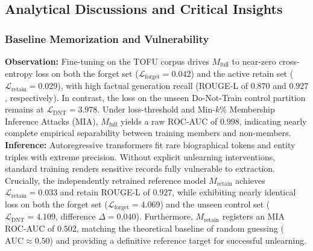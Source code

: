 \documentclass[11pt,a4paper]{article}
\begin{document}
\subsection{Analytical Discussions and Critical Insights}

\subsubsection{Baseline Memorization and Vulnerability}
\textbf{Observation:} Fine-tuning on the TOFU corpus drives $M_{\text{full}}$ to near-zero cross-entropy loss on both the forget set ($\mathcal{L}_{\text{forget}} = 0.042$) and the active retain set ($\mathcal{L}_{\text{retain}} = 0.029$), with high factual generation recall (ROUGE-L of $0.870$ and $0.927$, respectively). In contrast, the loss on the unseen Do-Not-Train control partition remains at $\mathcal{L}_{\text{DNT}} = 3.978$. Under loss-threshold and Min-$k$\% Membership Inference Attacks (MIA), $M_{\text{full}}$ yields a raw ROC-AUC of $0.998$, indicating nearly complete empirical separability between training members and non-members. \\
\textbf{Inference:} Autoregressive transformers fit rare biographical tokens and entity triples with extreme precision. Without explicit unlearning interventions, standard training renders sensitive records fully vulnerable to extraction. Crucially, the independently retrained reference model $M_{\text{retain}}$ achieves $\mathcal{L}_{\text{retain}} = 0.033$ and retain ROUGE-L of $0.927$, while exhibiting nearly identical loss on both the forget set ($\mathcal{L}_{\text{forget}} = 4.069$) and the unseen control set ($\mathcal{L}_{\text{DNT}} = 4.109$, difference $\Delta = 0.040$). Furthermore, $M_{\text{retain}}$ registers an MIA ROC-AUC of $0.502$, matching the theoretical baseline of random guessing ($\text{AUC} \approx 0.50$) and providing a definitive reference target for successful unlearning.
\end{document}
